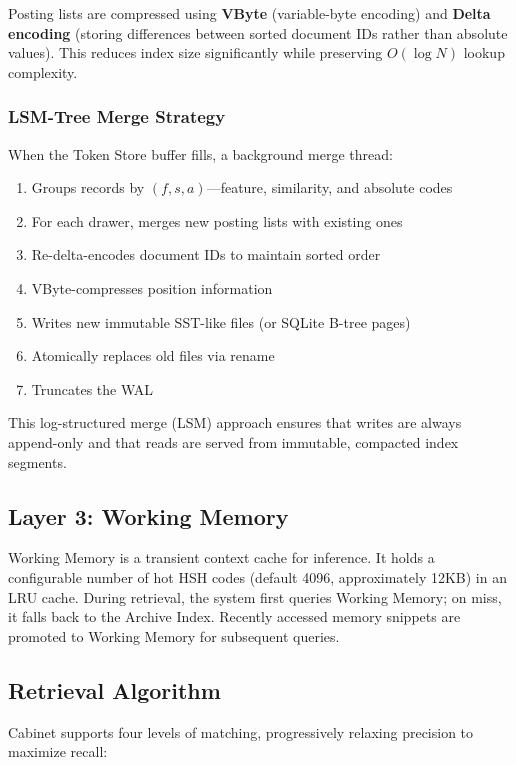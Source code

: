 \documentclass[11pt,a4paper]{article}
\theoremstyle{definition}
\begin{document}
Posting lists are compressed using \textbf{VByte} (variable-byte encoding) and \textbf{Delta encoding} (storing differences between sorted document IDs rather than absolute values). This reduces index size significantly while preserving $O(\log N)$ lookup complexity.

\subsubsection{LSM-Tree Merge Strategy}

When the Token Store buffer fills, a background merge thread:
\begin{enumerate}
    \item Groups records by $(f, s, a)$---feature, similarity, and absolute codes
    \item For each drawer, merges new posting lists with existing ones
    \item Re-delta-encodes document IDs to maintain sorted order
    \item VByte-compresses position information
    \item Writes new immutable SST-like files (or SQLite B-tree pages)
    \item Atomically replaces old files via rename
    \item Truncates the WAL
\end{enumerate}

This log-structured merge (LSM) approach ensures that writes are always append-only and that reads are served from immutable, compacted index segments.

\subsection{Layer 3: Working Memory}

Working Memory is a transient context cache for inference. It holds a configurable number of hot HSH codes (default 4096, approximately 12KB) in an LRU cache. During retrieval, the system first queries Working Memory; on miss, it falls back to the Archive Index. Recently accessed memory snippets are promoted to Working Memory for subsequent queries.

\subsection{Retrieval Algorithm}
\label{sec:retrieval}

Cabinet supports four levels of matching, progressively relaxing precision to maximize recall:
\end{document}
